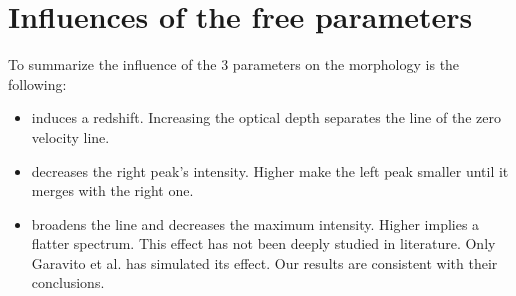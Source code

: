 \section{Influences of the free parameters}

To summarize the influence of the 3 parameters on the \lya morphology is the following: 

\begin{itemize}
\item \tauh induces a redshift. Increasing the optical depth separates the line of the zero velocity line. \\
\item \vout decreases the right peak's intensity. Higher \vout make the left peak smaller until it merges with the right one. \\
\item \vrot broadens the line and decreases the maximum intensity. Higher \vrot implies a flatter spectrum. This effect has not been deeply studied in literature. Only Garavito et al. \cite{Garavito14} has simulated its effect. Our results are consistent with their conclusions. 
\end{itemize}